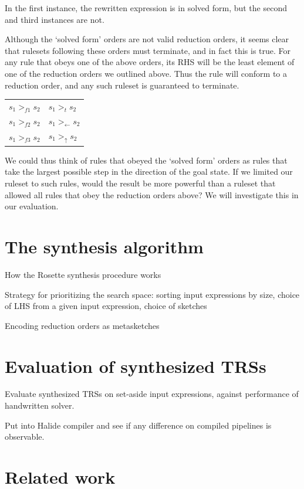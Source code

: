 In the first instance, the rewritten expression is in solved form, but the second and third instances are not.

Although the `solved form' orders are not valid reduction orders, it seems clear that rulesets following these orders must terminate, and in fact this is true. For any rule that obeys one of the above orders, its RHS will be the least element of one of the reduction orders we outlined above. Thus the rule will conform to a reduction order, and any such ruleset is guaranteed to terminate.

\begin{tabular}{l|l}
$s_1 >_{f1} s_2$ & $s_1 >_{t} s_2$ \\
$s_1 >_{f2} s_2$ & $s_1 >_{\leftarrow} s_2$ \\
$s_1 >_{f3} s_2$ & $s_1 >_{\uparrow} s_2$
\end{tabular}

We could thus think of rules that obeyed the `solved form' orders as rules that take the largest possible step in the direction of the goal state. If we limited our ruleset to such rules, would the result be more powerful than a ruleset that allowed all rules that obey the reduction orders above? We will investigate this in our evaluation.

\section{The synthesis algorithm}

How the Rosette synthesis procedure works

Strategy for prioritizing the search space: sorting input expressions by size, choice of LHS from a given input expression, choice of sketches

Encoding reduction orders as metasketches

\section{Evaluation of synthesized TRSs}

Evaluate synthesized TRSs on set-aside input expressions, against performance of handwritten solver.

Put into Halide compiler and see if any difference on compiled pipelines is observable.


\section{Related work}
\label{sec:related}

